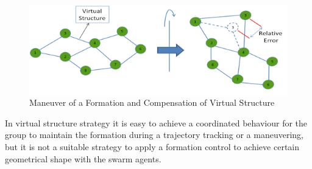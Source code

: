 \begin{figure}[H]
	\caption{Maneuver of a Formation and Compensation of Virtual Structure} \label{virtual_structir}
	\centering
	\includegraphics[scale = 0.95]{virtual_structure}
\end{figure}

In virtual structure strategy it is easy to achieve a coordinated behaviour for the group to maintain the formation during a trajectory tracking or a maneuvering, but it is not a suitable strategy to apply a formation control to achieve certain geometrical shape with the swarm agents. 


